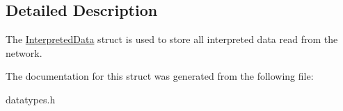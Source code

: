 \subsection{Detailed Description}
The \hyperlink{struct_interpreted_data}{Interpreted\+Data} struct is used to store all interpreted data read from the network. 

The documentation for this struct was generated from the following file\+:\begin{DoxyCompactItemize}
\item 
datatypes.\+h\end{DoxyCompactItemize}
